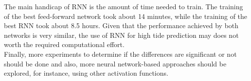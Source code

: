 \documentclass[10pt,a4paper]{article}
\begin{document}
The main handicap of RNN is the amount of time needed to train. The training of the best feed-forward network took about 14 minutes, while the training of the best RNN took about 8.5 hours. Given that the performance achieved by both networks is very similar, the use of RNN for high tide prediction may does not worth the required computational effort.\\

Finally, more experiments to determine if the differences are significant or not should be done and also, more neural network-based approaches should be explored, for instance, using other activation functions.



\end{document}

